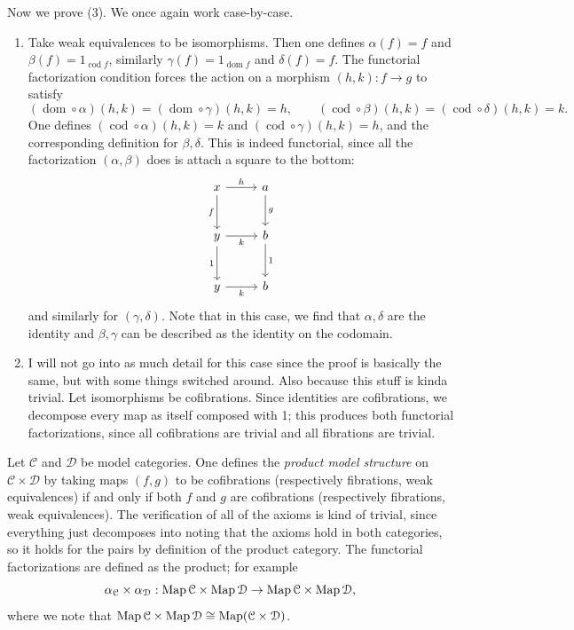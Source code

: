 \begin{example}
	Now we prove (3). We once again work case-by-case.
	\begin{enumerate}
		\item Take weak equivalences to be isomorphisms. Then one defines $\alpha(f)=f$ and $\beta(f)=1_{\operatorname{cod} f} $, similarly $\gamma(f)=1_{\operatorname{dom} f} $ and $\delta(f)=f$. The functorial factorization condition forces the action on a morphism $(h,k): f \to g$ to satisfy
			\[
				(\operatorname{dom} \circ \alpha)(h,k)=(\operatorname{dom} \circ \gamma)(h,k)=h,\qquad (\operatorname{cod} \circ \beta)(h,k)=(\operatorname{cod} \circ \delta)(h,k)=k
			.\]
			One defines $(\operatorname{cod} \circ \alpha)(h,k)=k$ and $(\operatorname{cod} \circ \gamma)(h,k)=h$, and the corresponding definition for $\beta,\delta$. This is indeed functorial, since all the factorization $(\alpha,\beta)$ does is attach a square to the bottom:
			\[\begin{tikzcd}[row sep = 2.5em, column sep = 2.5em]
			x\ar[" f "', d] \ar[" h ", r]  & a\ar[" g ", d]  \\
			y\ar[" 1 "', d] \ar[" k "', r]  & b \ar[" 1 ", d]  \\
			y \ar[" k "', r]  & b
			\end{tikzcd}\]
			and similarly for $(\gamma,\delta)$. Note that in this case, we find that $\alpha,\delta$ are the identity and $\beta,\gamma$ can be described as the identity on the codomain.
		\item I will not go into as much detail for this case since the proof is basically the same, but with some things switched around. Also because this stuff is kinda trivial. Let isomorphisms be cofibrations. Since identities are cofibrations, we decompose every map as itself composed with 1; this produces both functorial factorizations, since all cofibrations are trivial and all fibrations are trivial.
	\end{enumerate}
\end{example}

\begin{example}\label{1.1.10}
	Let $\mathcal{C} $ and $\mathcal{D} $ be model categories. One defines the \emph{product model structure} on $\mathcal{C} \times \mathcal{D} $ by taking maps $(f,g)$ to be cofibrations (respectively fibrations, weak equivalences) if and only if both $f$ and $g$ are cofibrations (respectively fibrations, weak equivalences). The verification of all of the axioms is kind of trivial, since everything just decomposes into noting that the axioms hold in both categories, so it holds for the pairs by definition of the product category. The functorial factorizations are defined as the product; for example
	\[
		\alpha_\mathcal{C} \times \alpha_\mathcal{D} : \operatorname{Map} \mathcal{C} \times \operatorname{Map} \mathcal{D}  \to \operatorname{Map} \mathcal{C} \times \operatorname{Map} \mathcal{D} 
	,\]
	where we note that $\operatorname{Map} \mathcal{C} \times \operatorname{Map} \mathcal{D} \cong \operatorname{Map} (\mathcal{C} \times \mathcal{D} )$.
\end{example}


